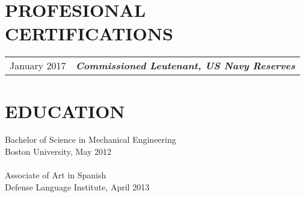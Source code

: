 \documentclass[line, margin]{resume}
\begin{document}
\begin{resume}
  \section{PROFESIONAL CERTIFICATIONS}
  \begin{tabular}{l l}
    January 2017 & \textbf{\textit{Commissioned Leutenant, US Navy Reserves}} \\ [5pt]
  \end{tabular}
  
  \section{EDUCATION} 
  Bachelor of Science in Mechanical Engineering \\
  Boston University, May 2012 \\
  \\
  Associate of Art in Spanish \\
  Defense Language Institute, April 2013 \\
  
  
\end{resume}
\end{document}
